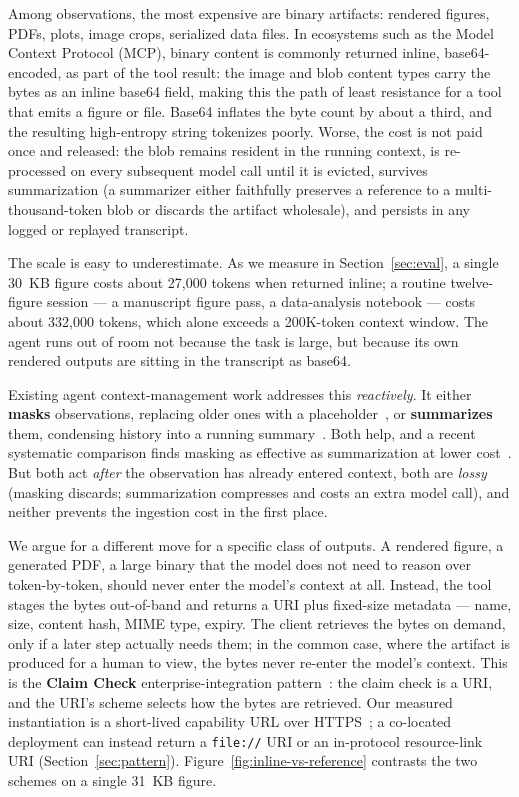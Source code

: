 \documentclass[11pt]{article}
\begin{document}
Among observations, the most expensive are binary artifacts: rendered figures, PDFs, plots, image crops, serialized data files. In ecosystems such as the Model Context Protocol (MCP), binary content is commonly returned inline, base64-encoded, as part of the tool result: the image and blob content types carry the bytes as an inline base64 field, making this the path of least resistance for a tool that emits a figure or file. Base64 inflates the byte count by about a third, and the resulting high-entropy string tokenizes poorly. Worse, the cost is not paid once and released: the blob remains resident in the running context, is re-processed on every subsequent model call until it is evicted, survives summarization (a summarizer either faithfully preserves a reference to a multi-thousand-token blob or discards the artifact wholesale), and persists in any logged or replayed transcript.

The scale is easy to underestimate. As we measure in Section~\ref{sec:eval}, a single 30~KB figure costs about 27{,}000 tokens when returned inline; a routine twelve-figure session --- a manuscript figure pass, a data-analysis notebook --- costs about 332{,}000 tokens, which alone exceeds a 200K-token context window. The agent runs out of room not because the task is large, but because its own rendered outputs are sitting in the transcript as base64.

Existing agent context-management work addresses this \emph{reactively}. It either \textbf{masks} observations, replacing older ones with a placeholder~\citep{sweagent}, or \textbf{summarizes} them, condensing history into a running summary~\citep{openhands}. Both help, and a recent systematic comparison finds masking as effective as summarization at lower cost~\citep{complexitytrap}. But both act \emph{after} the observation has already entered context, both are \emph{lossy} (masking discards; summarization compresses and costs an extra model call), and neither prevents the ingestion cost in the first place.

We argue for a different move for a specific class of outputs. A rendered figure, a generated PDF, a large binary that the model does not need to reason over token-by-token, should never enter the model's context at all. Instead, the tool stages the bytes out-of-band and returns a URI plus fixed-size metadata --- name, size, content hash, MIME type, expiry. The client retrieves the bytes on demand, only if a later step actually needs them; in the common case, where the artifact is produced for a human to view, the bytes never re-enter the model's context. This is the \textbf{Claim Check} enterprise-integration pattern~\citep{claimcheck}: the claim check is a URI, and the URI's scheme selects how the bytes are retrieved. Our measured instantiation is a short-lived capability URL over HTTPS~\citep{capurls}; a co-located deployment can instead return a \texttt{file://} URI or an in-protocol resource-link URI (Section~\ref{sec:pattern}). Figure~\ref{fig:inline-vs-reference} contrasts the two schemes on a single 31~KB figure.
\end{document}
